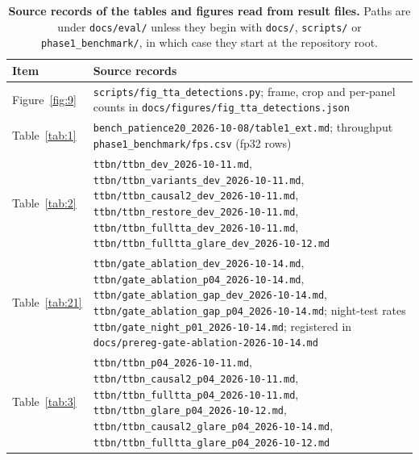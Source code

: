 \documentclass[10pt]{article}
\begin{document}
\begin{table}[htbp]
\centering
\footnotesize
\caption{\textbf{Source records of the tables and figures read from result files.} Paths are under \texttt{docs/\allowbreak{}eval/\allowbreak{}} unless they begin with \texttt{docs/\allowbreak{}}, \texttt{scripts/\allowbreak{}} or \texttt{phase1\_\allowbreak{}benchmark/\allowbreak{}}, in which case they start at the repository root.}
\label{tab:20}
\begin{tabularx}{\linewidth}{l>{\raggedright\arraybackslash}X}
\toprule
Item & Source records \\
\midrule
Figure~\ref{fig:9} & \texttt{scripts/\allowbreak{}fig\_\allowbreak{}tta\_\allowbreak{}detections.py}; frame, crop and per-panel counts in \texttt{docs/\allowbreak{}figures/\allowbreak{}fig\_\allowbreak{}tta\_\allowbreak{}detections.json} \\
Table~\ref{tab:1} & \texttt{bench\_\allowbreak{}patience20\_\allowbreak{}2026-10-08/\allowbreak{}table1\_\allowbreak{}ext.md}; throughput \texttt{phase1\_\allowbreak{}benchmark/\allowbreak{}fps.csv} (fp32 rows) \\
Table~\ref{tab:2} & \texttt{ttbn/\allowbreak{}ttbn\_\allowbreak{}dev\_\allowbreak{}2026-10-11.md}, \texttt{ttbn/\allowbreak{}ttbn\_\allowbreak{}variants\_\allowbreak{}dev\_\allowbreak{}2026-10-11.md}, \texttt{ttbn/\allowbreak{}ttbn\_\allowbreak{}causal2\_\allowbreak{}dev\_\allowbreak{}2026-10-11.md}, \texttt{ttbn/\allowbreak{}ttbn\_\allowbreak{}restore\_\allowbreak{}dev\_\allowbreak{}2026-10-11.md}, \texttt{ttbn/\allowbreak{}ttbn\_\allowbreak{}fulltta\_\allowbreak{}dev\_\allowbreak{}2026-10-11.md}, \texttt{ttbn/\allowbreak{}ttbn\_\allowbreak{}fulltta\_\allowbreak{}glare\_\allowbreak{}dev\_\allowbreak{}2026-10-12.md} \\
Table~\ref{tab:21} & \texttt{ttbn/\allowbreak{}gate\_\allowbreak{}ablation\_\allowbreak{}dev\_\allowbreak{}2026-10-14.md}, \texttt{ttbn/\allowbreak{}gate\_\allowbreak{}ablation\_\allowbreak{}p04\_\allowbreak{}2026-10-14.md}, \texttt{ttbn/\allowbreak{}gate\_\allowbreak{}ablation\_\allowbreak{}gap\_\allowbreak{}dev\_\allowbreak{}2026-10-14.md}, \texttt{ttbn/\allowbreak{}gate\_\allowbreak{}ablation\_\allowbreak{}gap\_\allowbreak{}p04\_\allowbreak{}2026-10-14.md}; night-test rates \texttt{ttbn/\allowbreak{}gate\_\allowbreak{}night\_\allowbreak{}p01\_\allowbreak{}2026-10-14.md}; registered in \texttt{docs/\allowbreak{}prereg-gate-ablation-2026-10-14.md} \\
Table~\ref{tab:3} & \texttt{ttbn/\allowbreak{}ttbn\_\allowbreak{}p04\_\allowbreak{}2026-10-11.md}, \texttt{ttbn/\allowbreak{}ttbn\_\allowbreak{}causal2\_\allowbreak{}p04\_\allowbreak{}2026-10-11.md}, \texttt{ttbn/\allowbreak{}ttbn\_\allowbreak{}fulltta\_\allowbreak{}p04\_\allowbreak{}2026-10-11.md}, \texttt{ttbn/\allowbreak{}ttbn\_\allowbreak{}glare\_\allowbreak{}p04\_\allowbreak{}2026-10-12.md}, \texttt{ttbn/\allowbreak{}ttbn\_\allowbreak{}causal2\_\allowbreak{}glare\_\allowbreak{}p04\_\allowbreak{}2026-10-14.md}, \texttt{ttbn/\allowbreak{}ttbn\_\allowbreak{}fulltta\_\allowbreak{}glare\_\allowbreak{}p04\_\allowbreak{}2026-10-12.md} \\

\end{tabularx}
\end{table}
\end{document}
